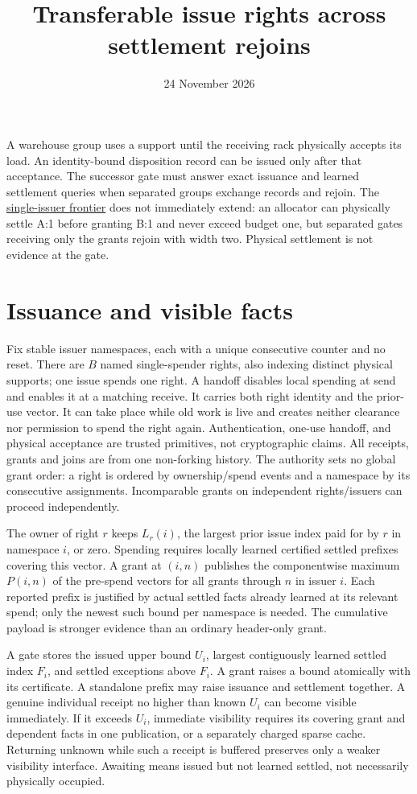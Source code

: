 \documentclass[11pt]{article}
\title{Transferable issue rights across settlement rejoins}
\date{24 November 2026}
\begin{document}
\maketitle

A warehouse group uses a support until the receiving rack physically accepts its load. An identity-bound disposition record can be issued only after that acceptance. The successor gate must answer exact issuance and learned settlement queries when separated groups exchange records and rejoin. The \href{https://github.com/eternal-november/eos-research-programmes/pull/352}{single-issuer frontier} does not immediately extend: an allocator can physically settle A:1 before granting B:1 and never exceed budget one, but separated gates receiving only the grants rejoin with width two. Physical settlement is not evidence at the gate.

\section{Issuance and visible facts}
Fix stable issuer namespaces, each with a unique consecutive counter and no reset. There are $B$ named single-spender rights, also indexing distinct physical supports; one issue spends one right. A handoff disables local spending at send and enables it at a matching receive. It carries both right identity and the prior-use vector. It can take place while old work is live and creates neither clearance nor permission to spend the right again. Authentication, one-use handoff, and physical acceptance are trusted primitives, not cryptographic claims. All receipts, grants and joins are from one non-forking history. The authority sets no global grant order: a right is ordered by ownership/spend events and a namespace by its consecutive assignments. Incomparable grants on independent rights/issuers can proceed independently.

The owner of right $r$ keeps $L_r(i)$, the largest prior issue index paid for by $r$ in namespace $i$, or zero. Spending requires locally learned certified settled prefixes covering this vector. A grant at $(i,n)$ publishes the componentwise maximum $P(i,n)$ of the pre-spend vectors for all grants through $n$ in issuer $i$. Each reported prefix is justified by actual settled facts already learned at its relevant spend; only the newest such bound per namespace is needed. The cumulative payload is stronger evidence than an ordinary header-only grant.

A gate stores the issued upper bound $U_i$, largest contiguously learned settled index $F_i$, and settled exceptions above $F_i$. A grant raises a bound atomically with its certificate. A standalone prefix may raise issuance and settlement together. A genuine individual receipt no higher than known $U_i$ can become visible immediately. If it exceeds $U_i$, immediate visibility requires its covering grant and dependent facts in one publication, or a separately charged sparse cache. Returning unknown while such a receipt is buffered preserves only a weaker visibility interface. Awaiting means issued but not learned settled, not necessarily physically occupied.
\end{document}
